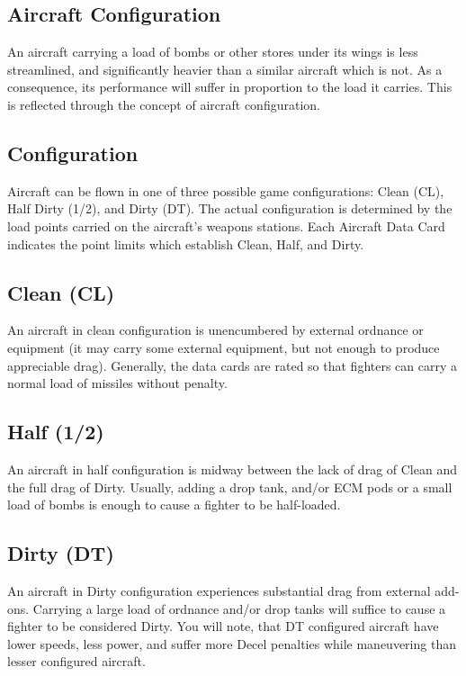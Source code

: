 \begin{advancedrules}

    \section{Aircraft Configuration}
    \label{rule:aircraft-configuration}

    An aircraft carrying a load of bombs or other stores under its wings is less streamlined, and significantly heavier than a similar aircraft which is not. As a consequence, its performance will suffer in proportion to the load it carries. This is reflected through the concept of aircraft configuration.

    \subsection{Configuration}
    Aircraft can be flown in one of three possible game configurations: Clean (CL), Half Dirty (1/2), and Dirty (DT). The actual configuration is determined by the  load points carried on the aircraft's weapons stations.  Each Aircraft Data Card indicates the point limits which establish Clean, Half, and Dirty. 

    \subsection{Clean (CL)}
    An aircraft in clean configuration is unencumbered by external ordnance or equipment (it may carry some external equipment, but not enough to produce appreciable drag). Generally, the data cards are rated so that fighters can carry a normal load of missiles without penalty.

    \subsection{Half (1/2)}
    An aircraft in half configuration is midway between the lack of drag of Clean and the full drag of Dirty. Usually, adding a drop tank, and/or ECM pods or a small load of bombs is enough to cause a fighter to be half-loaded.

    \subsection{Dirty (DT)}
    An aircraft in Dirty configuration experiences substantial drag from external add-ons. Carrying a large load of ordnance and/or drop tanks will suffice to cause a fighter to be considered Dirty. You will note, that DT configured aircraft have lower speeds, less power, and suffer more Decel penalties while maneuvering than lesser configured aircraft.


\end{advancedrules}
